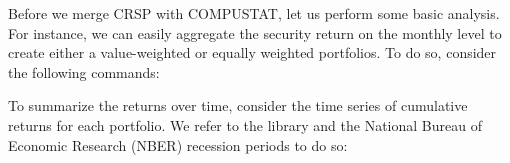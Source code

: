 Before we merge CRSP with COMPUSTAT, let us perform some basic
analysis. For instance, we can easily aggregate the security return on
the monthly level to create either a value-weighted or equally weighted
portfolios. To do so, consider the following commands:

\begin{Schunk}
\end{Schunk} %

To summarize the returns over time, consider the time series of
cumulative returns for each portfolio. We refer to the 
library and the National Bureau of Economic Research (NBER) recession periods to do so:

